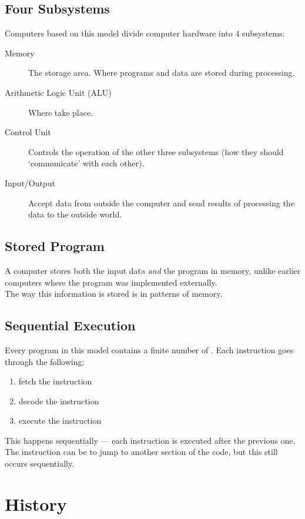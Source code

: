 \documentclass[\main/notes.tex]{subfiles}
\begin{document}
			\subsection{Four Subsystems}
				Computers based on this model divide computer hardware into $4$ subsystems:
				\begin{description}
					\item[Memory] The storage area. Where programs and data are stored during processing. 
					\item[Arithmetic Logic Unit (ALU)] Where  take place.
					\item[Control Unit] Controls the operation of the other three subsystems (how they should `communicate' with each other).
					\item[Input/Output] Accept data from outside the computer and send results of processing the data to the outside world. 
				\end{description}
			\subsection{Stored Program}
				A computer stores both the input data \emph{and} the program in memory, unlike earlier computers where the program was implemented externally.\\
				The way this information is stored is in  patterns of memory.
			\subsection{Sequential Execution}
				Every program in this model contains a finite number of . Each instruction goes through the following:
				\begin{enumerate}
					\item fetch the instruction
					\item decode the instruction
					\item execute the instruction
				\end{enumerate}
				This happens sequentially --- each instruction is executed after the previous one. The instruction can be to jump to another section of the code, but this still occurs sequentially.
		\pagebreak
		\section{History}
\end{document}
